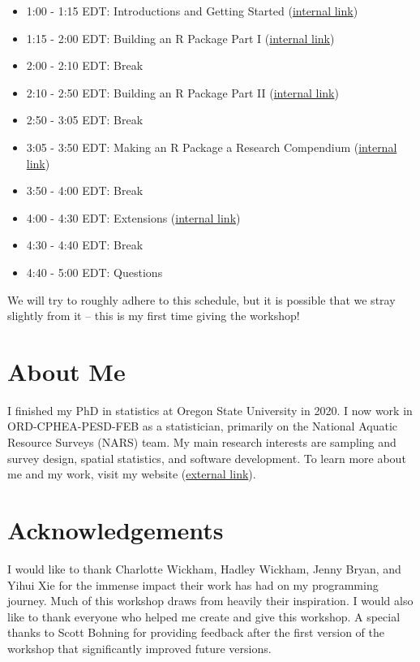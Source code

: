 \documentclass[
]{book}
\providecommand{\tightlist}{%
  \setlength{\itemsep}{0pt}\setlength{\parskip}{0pt}}
\begin{document}
\begin{itemize}
\tightlist
\item
  1:00 - 1:15 EDT: Introductions and Getting Started (\protect\hyperlink{getting-started}{internal link})
\item
  1:15 - 2:00 EDT: Building an R Package Part I (\protect\hyperlink{r-package}{internal link})
\item
  2:00 - 2:10 EDT: Break
\item
  2:10 - 2:50 EDT: Building an R Package Part II (\protect\hyperlink{r-package}{internal link})
\item
  2:50 - 3:05 EDT: Break
\item
  3:05 - 3:50 EDT: Making an R Package a Research Compendium (\protect\hyperlink{r-package-rc}{internal link})
\item
  3:50 - 4:00 EDT: Break
\item
  4:00 - 4:30 EDT: Extensions (\protect\hyperlink{extensions}{internal link})
\item
  4:30 - 4:40 EDT: Break
\item
  4:40 - 5:00 EDT: Questions
\end{itemize}

We will try to roughly adhere to this schedule, but it is possible that we stray slightly from it -- this is my first time giving the workshop!

\hypertarget{about-me}{%
\section*{About Me}\label{about-me}}

I finished my PhD in statistics at Oregon State University in 2020. I now work in ORD-CPHEA-PESD-FEB as a statistician, primarily on the National Aquatic Resource Surveys (NARS) team. My main research interests are sampling and survey design, spatial statistics, and software development. To learn more about me and my work, visit my website (\href{https://michaeldumelle.github.io/}{external link}).

\hypertarget{acknowledgements}{%
\section*{Acknowledgements}\label{acknowledgements}}

I would like to thank Charlotte Wickham, Hadley Wickham, Jenny Bryan, and Yihui Xie for the immense impact their work has had on my programming journey. Much of this workshop draws from heavily their inspiration. I would also like to thank everyone who helped me create and give this workshop. A special thanks to Scott Bohning for providing feedback after the first version of the workshop that significantly improved future versions.
\end{document}
